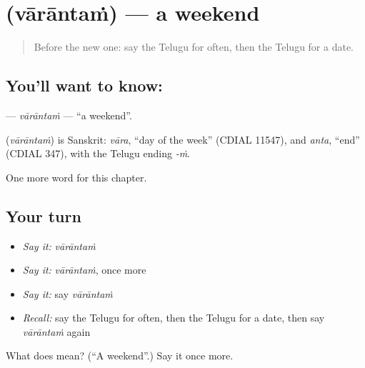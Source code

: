 \section[\texorpdfstring{\te{వారాంతం} (vārāntaṁ)}{వారాంతం (vārāntaṁ)}]{ (vārāntaṁ) — a weekend}

\label{lesson:TE-C170-varantam}



\begin{quote}
Before the new one: say the Telugu for often, then the Telugu for a date.
\end{quote}

\subsection*{You'll want to know: }
\textbf{} — \emph{vārāntaṁ} — \textquotedblleft{}a weekend\textquotedblright{}.

\begin{cousinweb}
\textbf{} (\emph{vārāntaṁ}) is Sanskrit: \emph{vāra}, \textquotedblleft{}day of the week\textquotedblright{} (CDIAL 11547), and \emph{anta}, \textquotedblleft{}end\textquotedblright{} (CDIAL 347), with the Telugu ending \emph{-ṁ}.
\end{cousinweb}

\begin{grammarlens}[title={What you've built}]
One more word for this chapter.
\end{grammarlens}

\subsection*{Your turn}
\begin{itemize}
\raggedright
  \item \emph{Say it:} \emph{vārāntaṁ}
  \item \emph{Say it:} \emph{vārāntaṁ}, once more
  \item \emph{Say it:} say \emph{vārāntaṁ}
  \item \emph{Recall:} say the Telugu for often, then the Telugu for a date, then say \emph{vārāntaṁ} again
\end{itemize}

\begin{tcolorbox}[breakable,colback=teal!4,colframe=teal!35!black,title={Before you move on}]
What does  mean? (\textquotedblleft{}A weekend\textquotedblright{}.) Say it once more.
\end{tcolorbox}
